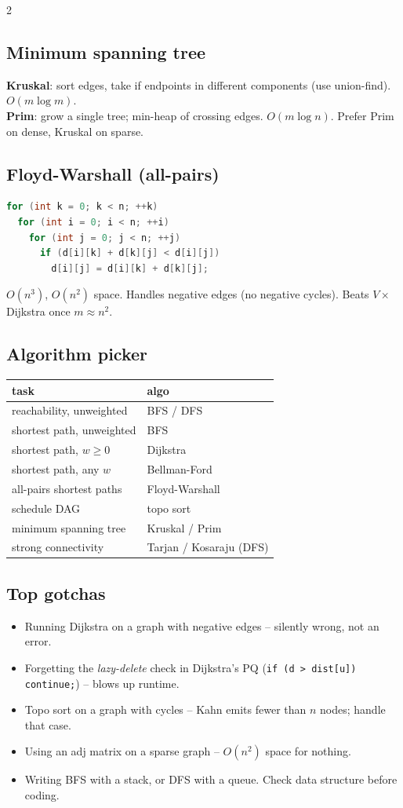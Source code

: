 \documentclass[10pt]{article}
\begin{document}
\begin{multicols}{2}
\subsection*{Minimum spanning tree}
\textbf{Kruskal}: sort edges, take if endpoints in different
components (use union-find). $O(m \log m)$.\\
\textbf{Prim}: grow a single tree; min-heap of crossing edges.
$O(m \log n)$. Prefer Prim on dense, Kruskal on sparse.

\subsection*{Floyd-Warshall (all-pairs)}
\begin{lstlisting}[language=C++]
for (int k = 0; k < n; ++k)
  for (int i = 0; i < n; ++i)
    for (int j = 0; j < n; ++j)
      if (d[i][k] + d[k][j] < d[i][j])
        d[i][j] = d[i][k] + d[k][j];
\end{lstlisting}
$O(n^3)$, $O(n^2)$ space. Handles negative edges (no negative
cycles). Beats $V \times$ Dijkstra once $m \approx n^2$.

\subsection*{Algorithm picker}
\begin{tabular}{@{}l|l@{}}
\textbf{task} & \textbf{algo}\\
\hline
reachability, unweighted & BFS / DFS\\
shortest path, unweighted& BFS\\
shortest path, $w \ge 0$ & Dijkstra\\
shortest path, any $w$   & Bellman-Ford\\
all-pairs shortest paths & Floyd-Warshall\\
schedule DAG             & topo sort\\
minimum spanning tree    & Kruskal / Prim\\
strong connectivity      & Tarjan / Kosaraju (DFS)
\end{tabular}

\subsection*{Top gotchas}
\begin{itemize}
    \item Running Dijkstra on a graph with negative edges -- silently
    wrong, not an error.
    \item Forgetting the \emph{lazy-delete} check in Dijkstra's PQ
    (\texttt{if (d > dist[u]) continue;}) -- blows up runtime.
    \item Topo sort on a graph with cycles -- Kahn emits fewer than
    $n$ nodes; handle that case.
    \item Using an adj matrix on a sparse graph -- $O(n^2)$ space
    for nothing.
    \item Writing BFS with a stack, or DFS with a queue. Check data
    structure before coding.
\end{itemize}

\end{multicols}
\end{document}
